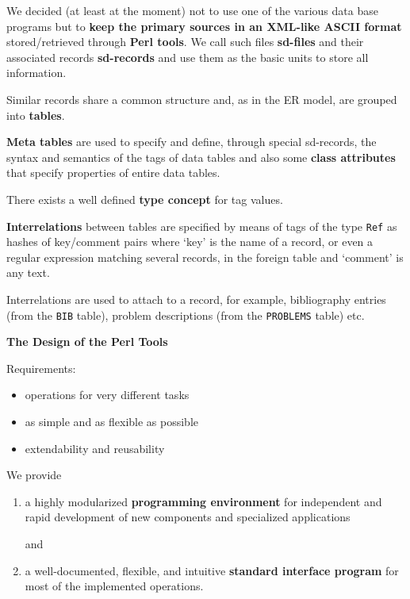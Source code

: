 \documentclass{slides}
\newcommand{\titel}[1]{\begin{center}\large\bf #1\end{center}}
\begin{document}
We decided (at least at the moment) not to use one of the various data
base programs but to {\bf keep the primary sources in an XML-like
ASCII format} stored/retrieved through {\bf Perl tools}. We call such
files {\bf sd-files} and their associated records {\bf sd-records} and
use them as the basic units to store all information. 

Similar records share a common structure and, as in the ER model, are
grouped into {\bf tables}.

{\bf Meta tables} are used to specify and define, through special
sd-records, the syntax and semantics of the tags of data tables and
also some {\bf class attributes} that specify properties of entire
data tables.

There exists a well defined {\bf type concept} for tag values.

{\bf Interrelations} between tables are specified by means of tags of
the type {\tt Ref} as hashes of key/comment pairs where `key' is the
name of a record, or even a regular expression matching several
records, in the foreign table and `comment' is any text.

Interrelations are used to attach to a record, for example,
bibliography entries (from the {\tt BIB} table), problem descriptions
(from the {\tt PROBLEMS} table) etc.

\pagebreak

\titel{The Design of the Perl Tools}

Requirements:

\begin{itemize}\setlength{\itemsep}{-15pt}
\item operations for very different tasks 
\item as simple and as flexible as possible
\item extendability and reusability
\end{itemize}

We provide
\begin{enumerate}
\item a highly modularized {\bf programming environment} 
for independent and rapid development of new components and
specialized applications

and 

\item a well-documented, flexible, and intuitive {\bf standard
interface program} for most of the implemented operations.
\end{enumerate}
\pagebreak
\end{document}
